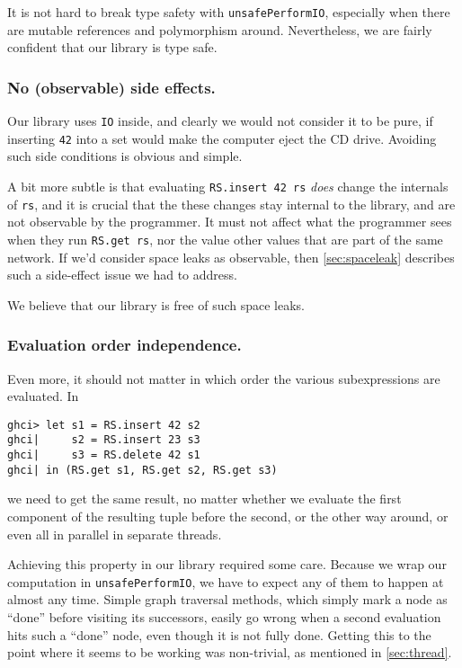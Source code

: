 \documentclass[manuscript,screen,acmsmall]{acmart}
\begin{document}
It is not hard to break type safety with \verb|unsafePerformIO|, especially when there are mutable references and polymorphism around. Nevertheless, we are fairly confident that our library is type safe.

\subsubsection{No (observable) side effects.}

Our library uses \verb|IO| inside, and clearly we would not consider it to be pure, if inserting \verb|42| into a set would make the computer eject the CD drive. Avoiding such side conditions is obvious and simple.

A bit more subtle is that evaluating \verb|RS.insert 42 rs| \emph{does} change the internals of \verb|rs|, and it is crucial that the these changes stay internal to the library, and are not observable by the programmer. It must not affect what the programmer sees when they run \verb|RS.get rs|, nor the value other values that are part of the same network. If we'd consider space leaks as observable, then \cref{sec:spaceleak} describes such a side-effect issue we had to address.

We believe that our library is free of such space leaks.

\subsubsection{Evaluation order independence.}

Even more, it should not matter in which order the various subexpressions are evaluated. In
\begin{verbatim}
ghci> let s1 = RS.insert 42 s2
ghci|     s2 = RS.insert 23 s3
ghci|     s3 = RS.delete 42 s1
ghci| in (RS.get s1, RS.get s2, RS.get s3)
\end{verbatim}
we need to get the same result, no matter whether we evaluate the first component of the resulting tuple before the second, or the other way around, or even all in parallel in separate threads.

Achieving this property in our library required some care. Because we wrap our computation in \verb|unsafePerformIO|, we have to expect any of them to happen at almost any time. Simple graph traversal methods, which simply mark a node as “done” before visiting its successors, easily go wrong when a second evaluation hits such a “done” node, even though it is not fully done. Getting this to the point where it seems to be working was non-trivial, as mentioned in \cref{sec:thread}.
\end{document}
